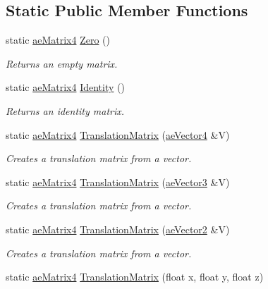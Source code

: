 \subsection*{Static Public Member Functions}
\begin{DoxyCompactItemize}
\item 
static \hyperlink{structae_core_1_1ae_matrix4}{ae\+Matrix4} \hyperlink{structae_core_1_1ae_matrix4_a2dcbe735a20f28db15c2e8dee3c7626b}{Zero} ()
\begin{DoxyCompactList}\small\item\em Returns an empty matrix. \end{DoxyCompactList}\item 
static \hyperlink{structae_core_1_1ae_matrix4}{ae\+Matrix4} \hyperlink{structae_core_1_1ae_matrix4_a4cc6d69ec7b0835fa4b955f4b761d3cb}{Identity} ()
\begin{DoxyCompactList}\small\item\em Returns an identity matrix. \end{DoxyCompactList}\item 
static \hyperlink{structae_core_1_1ae_matrix4}{ae\+Matrix4} \hyperlink{structae_core_1_1ae_matrix4_a8fd39b4a536d300effd44f8ccb331b43}{Translation\+Matrix} (\hyperlink{structae_core_1_1ae_vector4}{ae\+Vector4} \&V)
\begin{DoxyCompactList}\small\item\em Creates a translation matrix from a vector. \end{DoxyCompactList}\item 
static \hyperlink{structae_core_1_1ae_matrix4}{ae\+Matrix4} \hyperlink{structae_core_1_1ae_matrix4_a270de05a7fc6482f09349a8c0a150b16}{Translation\+Matrix} (\hyperlink{structae_core_1_1ae_vector3}{ae\+Vector3} \&V)
\begin{DoxyCompactList}\small\item\em Creates a translation matrix from a vector. \end{DoxyCompactList}\item 
static \hyperlink{structae_core_1_1ae_matrix4}{ae\+Matrix4} \hyperlink{structae_core_1_1ae_matrix4_a29ba2438fe624f422f052490304ac33f}{Translation\+Matrix} (\hyperlink{structae_core_1_1ae_vector2}{ae\+Vector2} \&V)
\begin{DoxyCompactList}\small\item\em Creates a translation matrix from a vector. \end{DoxyCompactList}\item 
static \hyperlink{structae_core_1_1ae_matrix4}{ae\+Matrix4} \hyperlink{structae_core_1_1ae_matrix4_a2ff3b6c40319aa653293ff61aabba00d}{Translation\+Matrix} (float x, float y, float z)

\end{DoxyCompactItemize}
